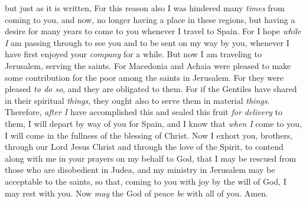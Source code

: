 \begin{biblechapter}
\verse but just as it is written,
 For this reason also I was hindered many \textit{times} from coming to you,
\verse and now, no longer having a place in these regions, but having a desire for many years to come to you
\verse whenever I travel to Spain. For I hope \textit{while I} am passing through to see you and to be sent on my way by you, whenever I have first enjoyed your \textit{company} for a while.
\verse But now I am traveling to Jerusalem, serving the saints.
\verse For Macedonia and Achaia were pleased to make some contribution for the poor among the saints in Jerusalem.
\verse For they were pleased \textit{to do so}, and they are obligated to them. For if the Gentiles have shared in their spiritual \textit{things}, they ought also to serve them in material \textit{things}.
\verse Therefore, \textit{after I} have accomplished this and sealed this fruit \textit{for delivery} to them, I will depart by way of you for Spain,
\verse and I know that \textit{when I} come to you, I will come in the fullness of the blessing of Christ.
\verse Now I exhort you, brothers, through our Lord Jesus Christ and through the love of the Spirit, to contend along with me in your prayers on my behalf to God,
\verse that I may be rescued from those who are disobedient in Judea, and my ministry in Jerusalem may be acceptable to the saints,
\verse so that, coming to you with joy by the will of God, I may rest with you.
\verse Now \textit{may} the God of peace \textit{be} with all of you. Amen.
\end{biblechapter}

